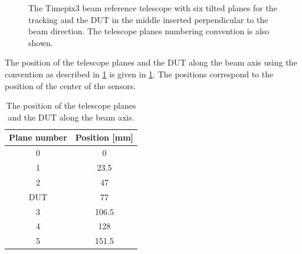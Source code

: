 \begin{figure}[htbp]
  \centering
  \caption{The Timepix3 beam reference telescope with six tilted
    planes for the tracking and the DUT in the middle inserted
    perpendicular to the beam direction. The telescope planes
    numbering convention is also shown.}
  \label{fig:TPX3Telescope}
\end{figure}

The position of the telescope planes and the DUT along the beam axis
using the convention as described in \cref{fig:TPX3Telescope} is given
in \cref{tab:planePos}. The positions correspond to the position of
the center of the sensors.

\begin{table}[htbp]
  \centering
  \caption{The position of the telescope planes and the DUT along the
    beam axis.}
  \label{tab:planePos}
  \begin{tabular}{ c c }
    \toprule
    Plane number & Position [mm] \\
    \midrule
    0 & 0 \\
    1 & 23.5 \\
    2 & 47 \\
    DUT & 77 \\
    3 & 106.5 \\
    4 & 128 \\
    5 & 151.5 \\
    \bottomrule
  \end{tabular}
\end{table}

